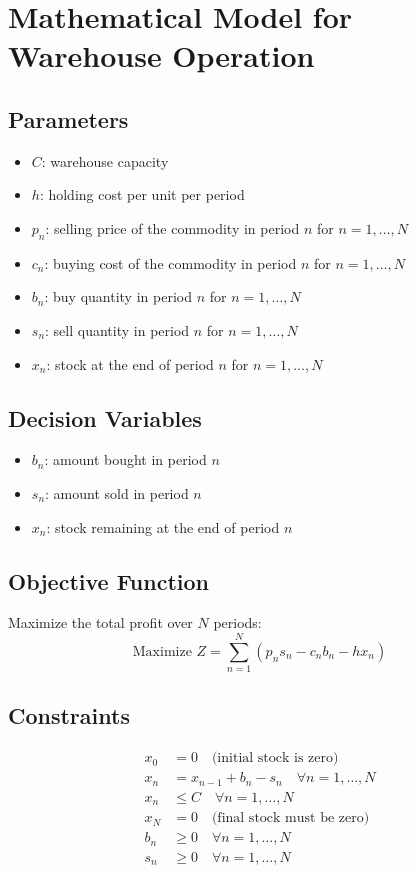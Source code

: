 \documentclass{article}
\begin{document}
\section*{Mathematical Model for Warehouse Operation}

\subsection*{Parameters}
\begin{itemize}
    \item $C$: warehouse capacity
    \item $h$: holding cost per unit per period
    \item $p_n$: selling price of the commodity in period $n$ for $n = 1, \ldots, N$
    \item $c_n$: buying cost of the commodity in period $n$ for $n = 1, \ldots, N$
    \item $b_n$: buy quantity in period $n$ for $n = 1, \ldots, N$
    \item $s_n$: sell quantity in period $n$ for $n = 1, \ldots, N$
    \item $x_n$: stock at the end of period $n$ for $n = 1, \ldots, N$
\end{itemize}

\subsection*{Decision Variables}
\begin{itemize}
    \item $b_n$: amount bought in period $n$ 
    \item $s_n$: amount sold in period $n$ 
    \item $x_n$: stock remaining at the end of period $n$
\end{itemize}

\subsection*{Objective Function}
Maximize the total profit over $N$ periods:
\[
\text{Maximize } Z = \sum_{n=1}^{N} \left( p_n s_n - c_n b_n - h x_n \right)
\]

\subsection*{Constraints}
\begin{align*}
    x_0 & = 0 \quad \text{(initial stock is zero)} \\
    x_n & = x_{n-1} + b_n - s_n \quad \forall n = 1, \ldots, N \\
    x_n & \leq C \quad \forall n = 1, \ldots, N \\
    x_N & = 0 \quad \text{(final stock must be zero)} \\
    b_n & \geq 0 \quad \forall n = 1, \ldots, N \\
    s_n & \geq 0 \quad \forall n = 1, \ldots, N \\
\end{align*}
\end{document}
